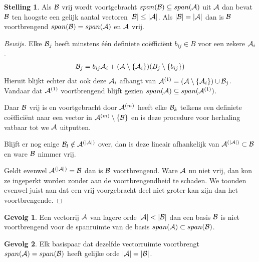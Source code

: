 \documentclass{amsart}
\theoremstyle{definition}
\newtheorem{thm}{Stelling}[section]
\newtheorem{csq}{Gevolg}[section]
\newenvironment{bewijs}{\begin{proof}[Bewijs]}{\end{proof}}
\newcommand{\setsm}[1]{\{{#1}\}}
\newcommand{\without}[1]{\setminus\setsm{#1}}
\newcommand{\abs}[1]{\lvert{#1}\rvert}
\newcommand{\vecrow}[1][a]{\mathcal{\MakeUppercase{#1}}}
\newcommand{\rvec}[2][i]{{#2}_{#1}}
\newcommand{\rvecr}[2][i]{\rvec[#1]{\vecrow[#2]}}
\begin{document}
\begin{thm}
	Als $\vecrow[b]$ vrij wordt voortgebracht $span(\vecrow[b]) \subseteq span(\vecrow)$ uit $\vecrow$ dan bevat $\vecrow[b]$ ten hoogste een gelijk aantal vectoren $\abs{\vecrow[b]} \leq \abs\vecrow$.
	Als $\abs{\vecrow[b]} = \abs\vecrow$ dan is $\vecrow[b]$ voortbrengend $span(\vecrow[b]) = span(\vecrow)$ en $\vecrow$ vrij. 
	\begin{bewijs}
		Elke $\vecrow[b]_j$ heeft minstens één definiete coëfficiënt $b_{ij} \in B$ voor een zekere $\vecrow_i$.
		\begin{align*}
			\vecrow[b]_j = b_{ij}\vecrow_i + (\vecrow \without{\vecrow_i})(B_j  \without{b_{ij}}) 
		\end{align*}
		Hieruit blijkt echter dat ook deze $\vecrow_i$ afhangt van  $\vecrow^{(1)} = \left(\vecrow \without{\vecrow_i}\right) \cup \rvecr[j]{b}$.
		Vandaar dat $\vecrow^{(1)}$ voortbrengend blijft gezien $span(\vecrow) \subseteq span(\vecrow^{(1)})$.

		Daar $\vecrow[b]$ vrij is en voortgebracht door $\vecrow^{(m)}$ heeft elke $\rvecr[k]{b}$ telkens een definiete coëfficiënt naar een vector in $\vecrow^{(m)}\without{\vecrow[b]}$
		en is deze procedure voor herhaling vatbaar tot we $\vecrow$ uitputten.

		Blijft er nog enige $\vecrow[b]_l \notin \vecrow^{(\abs{\vecrow})}$ over,
		dan is deze lineair afhankelijk van $\vecrow^{(\abs\vecrow)} \subset \vecrow[b]$ en ware $\vecrow[b]$ nimmer vrij.

		Geldt evenwel $\vecrow^{(\abs{\vecrow})} = \vecrow[b]$ dan is $\vecrow[b]$ voortbrengend.
		Ware $\vecrow$ nu niet vrij, dan kon ze ingeperkt worden zonder aan de voortbrengendheid te schaden.
		We toonden evenwel juist aan dat een vrij voorgebracht deel niet groter kan zijn dan het voortbrengende.
	\end{bewijs}
\end{thm}

\begin{csq}
	Een vectorrij $\vecrow$ van lagere orde $\abs\vecrow < \abs{\vecrow[b]}$ dan een basis $\vecrow[b]$ is niet voortbrengend voor de spanruimte van de basis $span(\vecrow) \subset span(\vecrow[b])$.
\end{csq}

\begin{csq}
	Elk basispaar dat dezelfde vectorruimte voortbrengt $span(\vecrow) = span(\vecrow[b])$ heeft gelijke orde $\abs\vecrow = \abs{\vecrow[b]}$.
\end{csq}
\end{document}
